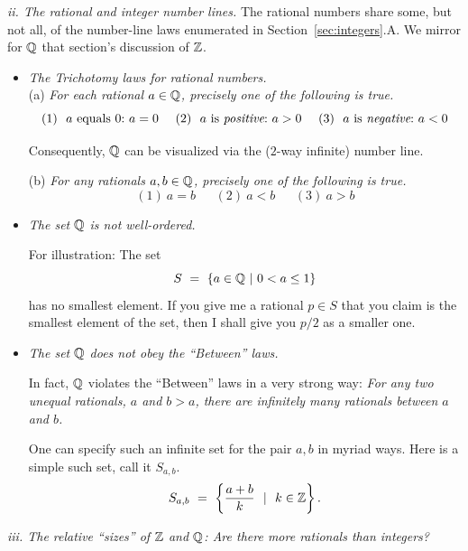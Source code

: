 \medskip

{\it ii. The rational and integer number lines.}
%
The rational numbers share some, but not all, of the number-line laws
enumerated in Section~\ref{sec:integers}.A.  We mirror for $\mathbb{Q}$ that
section's discussion of $\mathbb{Z}$.
\begin{itemize}
\item
{\it The Trichotomy laws for rational numbers.} \\
(a)
%
{\it For each rational $a \in \mathbb{Q}$, precisely one of the following is true.}
\[
(1) \ \mbox{ $a$ equals $0$:} \ a=0 \ \ \ \
(2) \ \mbox{ $a$ is {\em positive}:} \ a>0 \ \ \ \
(3) \ \mbox{ $a$ is {\em negative}:} \ a<0
\]

Consequently, $\mathbb{Q}$ can be visualized via the ($2$-way infinite) number
line.

\medskip

(b)
%
{\it For any rationals $a, b \in \mathbb{Q}$, precisely one of the following is
  true.}
\[ (1) \ a=b \ \ \ \ \ \ \ (2) \ a<b \ \ \ \ \ \ \ (3) \ a>b \]

\item
{\em The set $\mathbb{Q}$ is {\em not} well-ordered.}

For illustration:  The set
\[ S \ = \ \{ a \in \mathbb{Q}  \ |\ 0 < a \leq 1 \} \]
has no smallest element.  If you give me a rational $p \in S$ that you
claim is the smallest element of the set, then I shall give you $p/2$
as a smaller one.

\medskip

\item
{\em The set $\mathbb{Q}$ does {\em not} obey the ``Between'' laws.}

In fact, $\mathbb{Q}$ violates the ``Between'' laws in a very strong way:
{\it For any two unequal rationals, $a$ and $b>a$, there are
  infinitely many rationals between $a$ and $b$.}

One can specify such an infinite set for the pair $a,b$ in myriad
ways.  Here is a simple such set, call it $S_{a,b}$.
\begin{equation}
\label{eq:between-rationals}
S_{a,b} \ = \ \left\{ \frac{a+b}{k} \ \ | \ \ k \in \mathbb{Z} \right\}.
\end{equation}
\end{itemize}

\medskip

{\it iii. The relative ``sizes'' of $\mathbb{Z}$ and $\mathbb{Q}$: Are there more
  rationals than integers?}

